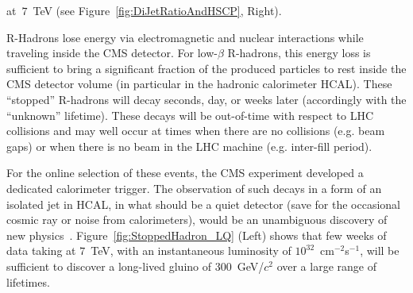 \documentclass{cmspaper}
\begin{document}
at~$7$~TeV (see Figure~\ref{fig:DiJetRatioAndHSCP}, Right).
%
%

R-Hadrons lose energy via electromagnetic and nuclear interactions 
while traveling inside the CMS detector. For low-$\beta$ R-hadrons, this energy loss is 
sufficient to bring a significant fraction of the produced particles 
to rest inside the CMS detector volume (in particular in the hadronic calorimeter HCAL). 
These ``stopped'' R-hadrons will decay seconds, day, or weeks later (accordingly with 
the ``unknown'' lifetime). These decays will be out-of-time with respect to LHC collisions 
and may well occur at times when there are no collisions (e.g. beam gaps) or when there is no beam in 
the LHC machine (e.g. inter-fill period).

For the online selection of these events, the CMS experiment 
developed a dedicated calorimeter trigger. The observation of such decays in a form of an isolated jet 
in HCAL, in what should be a quiet detector (save for the occasional cosmic ray or noise from calorimeters), 
would be an unambiguous discovery of new physics~\cite{StoppedGluinoPAS}. Figure~\ref{fig:StoppedHadron_LQ} (Left) shows 
that few weeks of data taking at $7$~TeV, with an instantaneous luminosity of  $10^{32}$~cm$^{-2}$s$^{-1}$, 
will be sufficient to discover a long-lived gluino of 300~GeV/$c^2$ over a large range of lifetimes.
\end{document}

